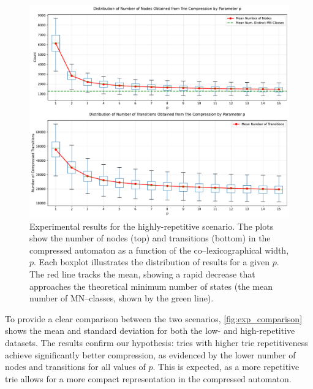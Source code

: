 \begin{figure}[H]
    \centering
    \includegraphics[width=1\linewidth]{Immagini/tree_compression_analysis_high.pdf}
    \caption{Experimental results for the highly-repetitive scenario. The plots show the number of nodes (top) and transitions (bottom) in the compressed automaton as a function of the co--lexicographical width, $p$. Each boxplot illustrates the distribution of results for a given $p$. The red line tracks the mean, showing a rapid decrease that approaches the theoretical minimum number of states (the mean number of MN--classes, shown by the green line).}
    \label{fig:exp_high_rep}
\end{figure}

To provide a clear comparison between the two scenarios, \cref{fig:exp_comparison} shows the mean and standard deviation for both the low- and high-repetitive datasets. The results confirm our hypothesis: tries with higher trie repetitiveness achieve significantly better compression, as evidenced by the lower number of nodes and transitions for all values of $p$. This is expected, as a more repetitive trie allows for a more compact representation in the compressed automaton.

